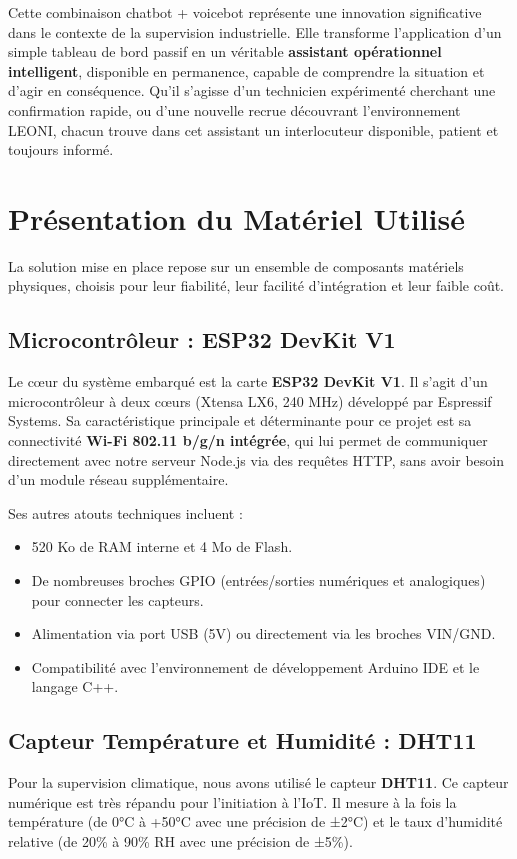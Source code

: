 \documentclass[12pt,a4paper]{report}
\begin{document}
Cette combinaison chatbot + voicebot représente une innovation significative dans le contexte de la supervision industrielle. Elle transforme l'application d'un simple tableau de bord passif en un véritable \textbf{assistant opérationnel intelligent}, disponible en permanence, capable de comprendre la situation et d'agir en conséquence. Qu'il s'agisse d'un technicien expérimenté cherchant une confirmation rapide, ou d'une nouvelle recrue découvrant l'environnement LEONI, chacun trouve dans cet assistant un interlocuteur disponible, patient et toujours informé.

\section{Présentation du Matériel Utilisé}

La solution mise en place repose sur un ensemble de composants matériels physiques, choisis pour leur fiabilité, leur facilité d'intégration et leur faible coût.

\subsection{Microcontrôleur : ESP32 DevKit V1}
Le cœur du système embarqué est la carte \textbf{ESP32 DevKit V1}. Il s'agit d'un microcontrôleur à deux cœurs (Xtensa LX6, 240 MHz) développé par Espressif Systems. Sa caractéristique principale et déterminante pour ce projet est sa connectivité \textbf{Wi-Fi 802.11 b/g/n intégrée}, qui lui permet de communiquer directement avec notre serveur Node.js via des requêtes HTTP, sans avoir besoin d'un module réseau supplémentaire.

Ses autres atouts techniques incluent :
\begin{itemize}
    \item 520 Ko de RAM interne et 4 Mo de Flash.
    \item De nombreuses broches GPIO (entrées/sorties numériques et analogiques) pour connecter les capteurs.
    \item Alimentation via port USB (5V) ou directement via les broches VIN/GND.
    \item Compatibilité avec l'environnement de développement Arduino IDE et le langage C++.
\end{itemize}

\subsection{Capteur Température et Humidité : DHT11}
Pour la supervision climatique, nous avons utilisé le capteur \textbf{DHT11}. Ce capteur numérique est très répandu pour l'initiation à l'IoT. Il mesure à la fois la température (de 0°C à +50°C avec une précision de ±2°C) et le taux d'humidité relative (de 20\% à 90\% RH avec une précision de ±5\%). 
\end{document}
